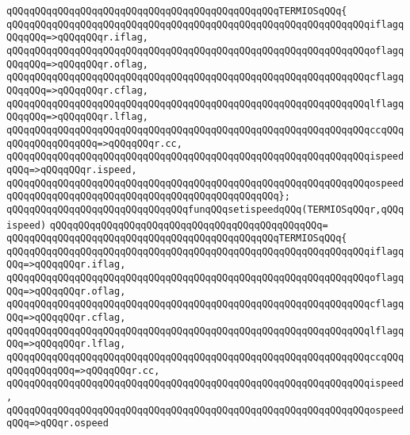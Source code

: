 \verb|qQQqqQQqqQQqqQQqqQQqqQQqqQQqqQQqqQQqqQQqqQQqqQQqTERMIOSqQQq{|\newline
\verb|qQQqqQQqqQQqqQQqqQQqqQQqqQQqqQQqqQQqqQQqqQQqqQQqqQQqqQQqqQQqqQQqiflagqQQqqQQq=>qQQqqQQqr.iflag,|\newline
\verb|qQQqqQQqqQQqqQQqqQQqqQQqqQQqqQQqqQQqqQQqqQQqqQQqqQQqqQQqqQQqqQQqoflagqQQqqQQq=>qQQqqQQqr.oflag,|\newline
\verb|qQQqqQQqqQQqqQQqqQQqqQQqqQQqqQQqqQQqqQQqqQQqqQQqqQQqqQQqqQQqqQQqcflagqQQqqQQq=>qQQqqQQqr.cflag,|\newline
\verb|qQQqqQQqqQQqqQQqqQQqqQQqqQQqqQQqqQQqqQQqqQQqqQQqqQQqqQQqqQQqqQQqlflagqQQqqQQq=>qQQqqQQqr.lflag,|\newline
\verb|qQQqqQQqqQQqqQQqqQQqqQQqqQQqqQQqqQQqqQQqqQQqqQQqqQQqqQQqqQQqqQQqccqQQqqQQqqQQqqQQqqQQq=>qQQqqQQqr.cc,|\newline
\verb|qQQqqQQqqQQqqQQqqQQqqQQqqQQqqQQqqQQqqQQqqQQqqQQqqQQqqQQqqQQqqQQqispeedqQQq=>qQQqqQQqr.ispeed,|\newline
\verb|qQQqqQQqqQQqqQQqqQQqqQQqqQQqqQQqqQQqqQQqqQQqqQQqqQQqqQQqqQQqqQQqospeed|\newline
\verb|qQQqqQQqqQQqqQQqqQQqqQQqqQQqqQQqqQQqqQQqqQQqqQQq};|\newline
\newline
\verb|qQQqqQQqqQQqqQQqqQQqqQQqqQQqqQQqfunqQQqsetispeedqQQq(TERMIOSqQQqr,qQQqispeed)|\newline
\verb|qQQqqQQqqQQqqQQqqQQqqQQqqQQqqQQqqQQqqQQqqQQqqQQq=|\newline
\verb|qQQqqQQqqQQqqQQqqQQqqQQqqQQqqQQqqQQqqQQqqQQqqQQqTERMIOSqQQq{|\newline
\verb|qQQqqQQqqQQqqQQqqQQqqQQqqQQqqQQqqQQqqQQqqQQqqQQqqQQqqQQqqQQqqQQqiflagqQQq=>qQQqqQQqr.iflag,|\newline
\verb|qQQqqQQqqQQqqQQqqQQqqQQqqQQqqQQqqQQqqQQqqQQqqQQqqQQqqQQqqQQqqQQqoflagqQQq=>qQQqqQQqr.oflag,|\newline
\verb|qQQqqQQqqQQqqQQqqQQqqQQqqQQqqQQqqQQqqQQqqQQqqQQqqQQqqQQqqQQqqQQqcflagqQQq=>qQQqqQQqr.cflag,|\newline
\verb|qQQqqQQqqQQqqQQqqQQqqQQqqQQqqQQqqQQqqQQqqQQqqQQqqQQqqQQqqQQqqQQqlflagqQQq=>qQQqqQQqr.lflag,|\newline
\verb|qQQqqQQqqQQqqQQqqQQqqQQqqQQqqQQqqQQqqQQqqQQqqQQqqQQqqQQqqQQqqQQqccqQQqqQQqqQQqqQQq=>qQQqqQQqr.cc,|\newline
\verb|qQQqqQQqqQQqqQQqqQQqqQQqqQQqqQQqqQQqqQQqqQQqqQQqqQQqqQQqqQQqqQQqispeed,|\newline
\verb|qQQqqQQqqQQqqQQqqQQqqQQqqQQqqQQqqQQqqQQqqQQqqQQqqQQqqQQqqQQqqQQqospeedqQQq=>qQQqr.ospeed|\newline
